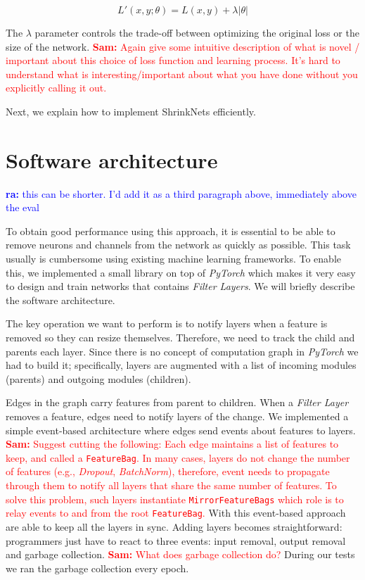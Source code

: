 \documentclass[sigconf]{acmart}
\newcommand{\srm}[1]{\textcolor{red}{{\bf Sam:} #1}}
\newcommand{\ra}[1]{\textcolor{blue}{{\bf ra:} #1}}
\begin{document}
\begin{equation}
  L'(x,y;\theta) = L(x, y) + \lambda|\theta|
\end{equation}

The $\lambda$ parameter controls the trade-off between optimizing the original
loss or the size of the network.  \srm{Again give some intuitive description of
what is novel / important about this choice of loss function and learning
process.  It's hard to understand what is interesting/important about what you
have done without you explicitly calling it out.}

Next, we explain how to implement ShrinkNets efficiently.

\section{Software architecture}

\ra{this can be shorter. I'd add it as a third paragraph above, immediately
above the eval}

To obtain good performance using this approach, it is essential to be able to
remove neurons and channels from the network as quickly as possible. This task
usually is cumbersome using existing machine learning frameworks. To enable
this, we implemented a small library on top of \textit{PyTorch} which makes it
very easy to design and train networks that contains \textit{Filter Layers}. We
will briefly describe the software architecture.  \par The key operation we want
to perform is to notify layers when a feature is removed so they can resize
themselves. Therefore, we need to track the child and parents each layer. Since
there is no concept of computation graph in \textit{PyTorch} we had to build it;
specifically,  layers are augmented with a list of incoming modules (parents)
and outgoing modules (children).  \par Edges in the graph carry features from
parent to children. When a \textit{Filter Layer} removes a feature, edges need
to notify layers of the change.  We implemented a simple event-based
architecture where edges send events about features to layers.  \srm{Suggest
cutting the following: Each  edge maintains a list of features to keep, and
called a \texttt{FeatureBag}. In many cases, layers do not change the number of
features (e.g., \textit{Dropout}, \textit{BatchNorm}), therefore, event needs to
propagate through them to notify all layers that share the same number of
features. To solve this problem, such layers instantiate
\texttt{MirrorFeatureBags} which role is to relay events to and from the root
\texttt{FeatureBag}.} With this event-based approach are able to keep all the
layers in sync. Adding layers becomes straightforward: programmers just have to
react to three events: input removal, output removal and garbage collection.
\srm{What does garbage collection do?} During our tests we ran the garbage
collection every epoch.
\end{document}
